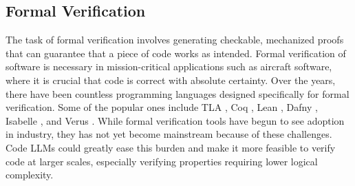 \subsection{Formal Verification}

The task of formal verification involves generating checkable, mechanized proofs that can guarantee that a piece of code works as intended. Formal verification of software is necessary in mission-critical applications such as aircraft software, where it is crucial that code is correct with absolute certainty. Over the years, there have been countless programming languages designed specifically for formal verification. Some of the popular ones include TLA \citep{lamport1994introduction}, Coq \citep{Coq-refman}, Lean \citep{de2015lean}, Dafny \citep{leino2010dafny}, Isabelle \citep{nipkow2002isabelle}, and Verus \citep{lattuada2024verus}. While formal verification tools have begun to see adoption in industry, they has not yet become mainstream because of these challenges. Code LLMs could greatly ease this burden and make it more feasible to verify code at larger scales, especially verifying properties requiring lower logical complexity.